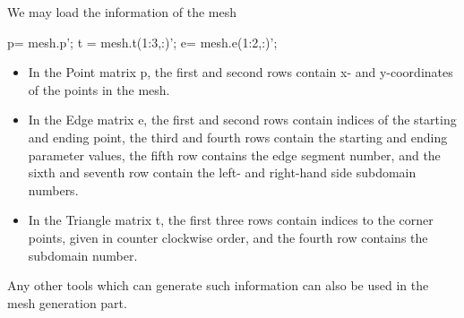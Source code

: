 \documentclass[12pt]{article}%
\numberwithin{equation}{section}
\numberwithin{remark}{section}
\numberwithin{example}{section}
\begin{document}
We may load the information of the mesh

\begin{shaded}
 p= mesh.p'; t =  {mesh.t}(1:3,:)';  {e}= {mesh.e}(1:2,:)';
 \end{shaded}

\begin{itemize}
\item In the Point matrix p, the first and second rows contain x- and y-coordinates of the points in the mesh.
\item In the Edge matrix e, the first and second rows contain indices of the starting and ending point,
the third and fourth rows contain the starting and ending parameter values, the fifth row contains the
edge segment number, and the sixth and seventh row contain the left- and right-hand side subdomain numbers.
\item In the Triangle matrix t, the first three rows contain indices to the corner points,
given in counter clockwise order, and the fourth row contains the subdomain number.
\end{itemize}
Any other tools which can generate such information can also be used in the mesh generation part.
\end{document}
